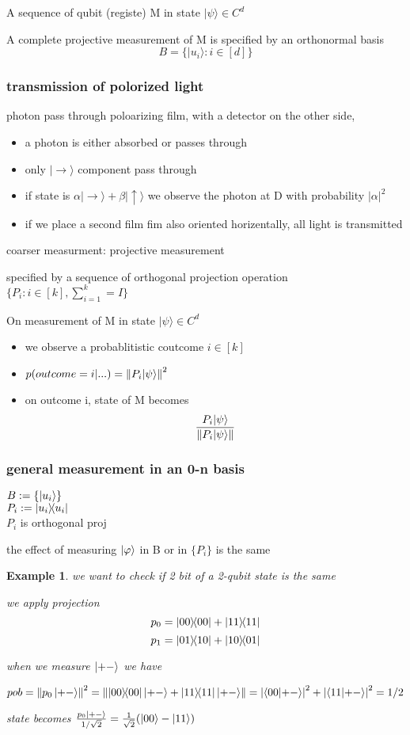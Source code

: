 \documentclass[10pt]{article}
\theoremstyle{break}
\newtheorem{ex}[thm]{Example}
\begin{document}
A sequence of qubit (registe) M in state $|\psi\rangle\in C^d$

A complete projective measurement of M is specified by an orthonormal basis
$$B=\{|u_i\rangle: i\in[d]\}$$

\subsubsection{transmission of polorized light}

photon pass through poloarizing film, with a detector on the other side,

\begin{itemize}
    \item a photon is either absorbed or passes through
    \item only $|\rightarrow\rangle$ component pass through 
    \item if state is $\alpha|\rightarrow\rangle+\beta|\uparrow\rangle$
    we observe the photon at D with probability $|\alpha|^2$
    \item if we place a second film fim also oriented horizentally, all light is transmitted
\end{itemize}



coarser measurment: projective measurement 

specified by a sequence of orthogonal projection operation
$\{P_i:i\in[k], \sum^k_{i=1}=I\}$

On measurement of M in state $|\psi\rangle\in C^d$
\begin{itemize}
    \item we observe a probablitistic coutcome $i\in [k]$
    \item $p(outcome=i|...)=\norm{P_i|\psi\rangle}^2$
    \item on outcome i, state of M becomes $$\frac{P_i|\psi\rangle }{\norm{P_i|\psi\rangle}}$$
\end{itemize}

\subsubsection{general measurement in an 0-n basis}
$B:=\{\ket{u_i}\}$\\$P_i:=\ketbra{u_i}{u_i}$\\$P_i$ is orthogonal proj

the effect of measuring $\ket{\varphi}$ in B or in $\{P_i\}$ is the same

\begin{ex}
    we want to check if 2 bit of a 2-qubit state is the same 

    we apply projection $$p_0=\ketbra{00}{00}+\ketbra{11}{11}$$$$p_1=\ketbra{01}{10}+\ketbra{10}{01}$$
    
    when we measure $\ket{+-}$ we have 

    $$pob=\norm{p_0\ket{+-}}^2=\norm{\ketbra{00}{00}\ket{+-}+
    \ketbra{11}{11}\ket{+-}}=\abs{\braket{00}{+-}}^2+\abs{\braket{11}{+-}}^2=1/2$$

    state becomes $\frac{p_0\ket{+-}}{1/\sqrt{2}}=\frac{1}{\sqrt{2}}(\ket{00}-\ket{11})$
\end{ex}
\end{document}
